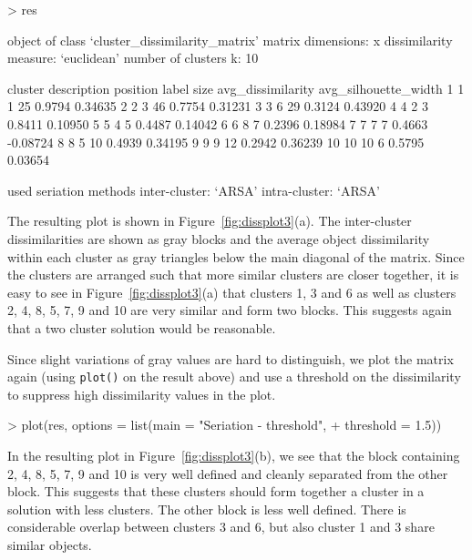 \documentclass[fleqn, a4paper]{article}
\newcommand{\func}[1]{\mbox{\texttt{#1()}}}
\begin{document}
\begin{Schunk}
\begin{Sinput}
> res
\end{Sinput}
\begin{Soutput}
object of class ‘cluster_dissimilarity_matrix’ 
matrix dimensions: x 
dissimilarity measure: ‘euclidean’ 
number of clusters k: 10 

cluster description
   position label size avg_dissimilarity avg_silhouette_width
1         1     1   25            0.9794              0.34635
2         2     3   46            0.7754              0.31231
3         3     6   29            0.3124              0.43920
4         4     2    3            0.8411              0.10950
5         5     4    5            0.4487              0.14042
6         6     8    7            0.2396              0.18984
7         7     7    7            0.4663             -0.08724
8         8     5   10            0.4939              0.34195
9         9     9   12            0.2942              0.36239
10       10    10    6            0.5795              0.03654

used seriation methods
inter-cluster: ‘ARSA’ 
intra-cluster: ‘ARSA’ 
\end{Soutput}
\end{Schunk}

The resulting plot is shown in Figure~\ref{fig:dissplot3}(a).  The
inter-cluster dissimilarities are shown as gray blocks and the average object
dissimilarity within each cluster as gray triangles below the main diagonal of
the matrix. Since the clusters are arranged such that more similar clusters
are closer together, it is easy to see in Figure~\ref{fig:dissplot3}(a)
that clusters 1, 3 and 6 as well as clusters 2, 4, 8, 5, 7, 9 and 10 
are very similar and form two blocks. 
This suggests again that a two cluster solution would
be reasonable.

Since slight variations of gray values are hard to distinguish,
we plot the matrix again (using \func{plot} on the result above) and
use a threshold on the dissimilarity to suppress high dissimilarity
values in the plot. 

\begin{Schunk}
\begin{Sinput}
> plot(res, options = list(main = "Seriation - threshold", 
+     threshold = 1.5))
\end{Sinput}
\end{Schunk}

In the resulting plot in Figure~\ref{fig:dissplot3}(b), we see that the
block containing 2, 4, 8, 5, 7, 9 and 10 is very well defined and
cleanly separated from the other block. This suggests that these clusters
should form together a cluster in a solution with less clusters.
The other block is less well defined. There is considerable overlap between
clusters 3 and 6, but also cluster 1 and 3 share similar objects.
\end{document}
